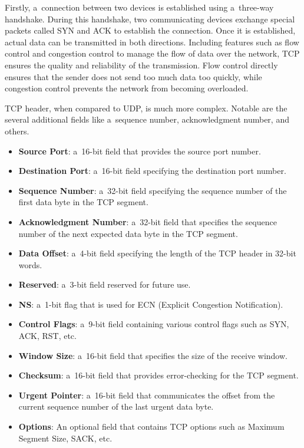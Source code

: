 \documentclass[
  printed,     %
  color,       %
  oneside,     %
  nosansbold,  %
  nocolorbold, %
  nolof,         %
  nolot,         %
]{fithesis4}
\begin{document}
Firstly, a~connection between two devices is established using a~three-way handshake. During this handshake, two communicating devices exchange special packets called SYN and ACK to establish the connection. Once it is established, actual data can be transmitted in both directions. Including features such as flow control and congestion control to manage the flow of data over the network, TCP ensures the quality and reliability of the transmission. Flow control directly ensures that the sender does not send too much data too quickly, while congestion control prevents the network from becoming overloaded.

TCP header, when compared to UDP, is much more complex. Notable are the several additional fields like a~sequence number, acknowledgment number, and others.

\begin{itemize}[noitemsep,topsep=0pt]
    \item \textbf{Source Port}: a~16-bit field that provides the source port number.
    \item \textbf{Destination Port}: a~16-bit field specifying the destination port number.
    \item \textbf{Sequence Number}: a~32-bit field specifying the sequence number of the first data byte in the TCP segment.
    \item \textbf{Acknowledgment Number}: a~32-bit field that specifies the sequence number of the next expected data byte in the TCP segment.
    \item \textbf{Data Offset}: a~4-bit field specifying the length of the TCP header in 32-bit words.
    \item \textbf{Reserved}: a~3-bit field reserved for future use.
    \item \textbf{NS}: a~1-bit flag that is used for ECN (Explicit Congestion Notification).
    \item \textbf{Control Flags}: a~9-bit field containing various control flags such as SYN, ACK, RST, etc.
    \item \textbf{Window Size}: a~16-bit field that specifies the size of the receive window.
    \item \textbf{Checksum}: a~16-bit field that provides error-checking for the TCP segment.
    \item \textbf{Urgent Pointer}: a~16-bit field that communicates the offset from the current sequence number of the last urgent data byte.
    \item \textbf{Options}: An optional field that contains TCP options such as Maximum Segment Size, SACK, etc.
\end{itemize}
\end{document}
